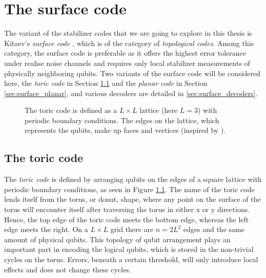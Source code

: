 
\chapter{The surface code}\label{ch:surfacecode}

The variant of the stabilizer codes that we are going to explore in this thesis is Kitaev's \emph{surface code} \cite{kitaev2003fault}, which is of the category of \emph{topological codes}. Among this category, the surface code is preferable as it offers the highest error tolerance under realise noise channels and requires only local stabilizer measurements of physically neighboring qubits. Two variants of the surface code will be considered here, the \emph{toric code} in Section \ref{sec:surface_toric} and the \emph{planar code} in Section \ref{sec:surface_planar}, and various decoders are detailed in \ref{sec:surface_decoders}.
\begin{figure}
  \centering
  \caption{The toric code is defined as a $L\times L$ lattice (here $L=3$) with periodic boundary conditions. The edges on the lattice, which represents the qubits, make up faces and vertices (inspired by \cite{browne}).}\label{sf:fig_toriclattice}
\end{figure}

\section{The toric code}\label{sec:surface_toric}
The \emph{toric code} is defined by arranging qubits on the edges of a square lattice with periodic boundary conditions, as seen in Figure \ref{sf:fig_toriclattice}. The name of the toric code lends itself from the torus, or donut, shape, where any point on the surface of the torus will encounter itself after traversing the torus in either x or y directions. Hence, the top edge of the toric code meets the bottom edge, whereas the left edge meets the right. On a $L\times L$ grid there are $n = 2L^2$ edges and the same amount of physical qubits. This topology of qubit arrangement plays an important part in encoding the logical qubits, which is stored in the non-trivial cycles on the torus. Errors, beneath a certain threshold, will only introduce local effects and does not change these cycles.


